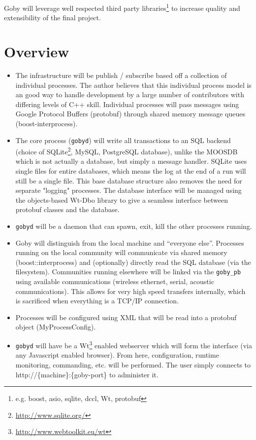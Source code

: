 \documentclass[10pt,letterpaper]{article}
\begin{document}
Goby will leverage well respected third party libraries\footnote{e.g. boost, asio, sqlite, dccl, Wt, protobuf} to increase quality and extensibility of the final project. 

\section{Overview}

\begin{itemize}
\item The infrastructure will be publish / subscribe based off a collection of individual processes. The author believes that this individual process model is an good way to handle development by a large number of contributors with differing levels of C++ skill. Individual processes will pass messages using Google Protocol Buffers (protobuf) through shared memory message queues (boost-interprocess).
\item The core process (\verb|gobyd|) will write all transactions to an SQL backend (choice of SQLite\footnote{\url{http://www.sqlite.org/}}, MySQL, PostgreSQL database), unlike the MOOSDB which is not actually a database, but simply a message handler. SQLite uses single files for entire databases, which means the log at the end of a run will still be a single file. This base database structure also removes the need for separate "logging" processes. The database interface will be managed using the objects-based Wt-Dbo library to give a seamless interface between protobuf classes and the database.
\item \verb|gobyd| will be a daemon that can spawn, exit, kill the other processes running.
\item Goby will distinguish from the local machine and ``everyone else''. Processes running on the local community will communicate via shared memory (boost::interprocess) and (optionally) directly read the SQL database (via the filesystem). Communities running elsewhere will be linked via the \verb|goby_pb| using available communications (wireless ethernet, serial, acoustic communications). This allows for very high speed transfers internally, which is sacrificed when everything is a TCP/IP connection. 
\item Processes will be configured using XML that will be read into a protobuf object (MyProcessConfig).
\item \verb|gobyd| will have be a Wt\footnote{\url{http://www.webtoolkit.eu/wt}} enabled webserver which will form the interface (via any Javascript enabled browser). From here, configuration, runtime monitoring, commanding, etc. will be performed. The user simply connects to http://\{machine\}:\{goby-port\} to administer it. 
\end{itemize}
\end{document}
